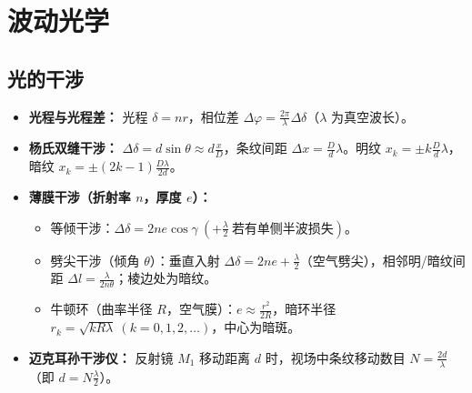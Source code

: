 \documentclass[zihao=5,a4paper,UTF8]{ctexart}
\begin{document}
\section{波动光学}

\subsection{光的干涉}

\begin{formulabox}[光的干涉核心公式]
\begin{itemize}
    \item \textbf{光程与光程差：} 光程 $\delta = nr$，相位差 $\Delta\varphi = \frac{2\pi}{\lambda}\Delta\delta$（$\lambda$ 为真空波长）。
    \item \textbf{杨氏双缝干涉：} $\Delta\delta = d\sin\theta \approx d\frac{x}{D}$，条纹间距 $\Delta x = \frac{D}{d}\lambda$。明纹 $x_k = \pm k\frac{D}{d}\lambda$，暗纹 $x_k = \pm(2k-1)\frac{D\lambda}{2d}$。
    \item \textbf{薄膜干涉（折射率 $n$，厚度 $e$）：}
    \begin{itemize}
        \item 等倾干涉：$\Delta\delta = 2ne\cos\gamma\ (+ \frac{\lambda}{2}\ \text{若有单侧半波损失})$。
        \item 劈尖干涉（倾角 $\theta$）：垂直入射 $\Delta\delta = 2ne + \frac{\lambda}{2}$（空气劈尖），相邻明/暗纹间距 $\Delta l = \frac{\lambda}{2n\theta}$；棱边处为暗纹。
        \item 牛顿环（曲率半径 $R$，空气膜）：$e \approx \frac{r^2}{2R}$，暗环半径 $r_k = \sqrt{kR\lambda}\ (k=0,1,2,\dots)$，中心为暗斑。
    \end{itemize}
    \item \textbf{迈克耳孙干涉仪：} 反射镜 $M_1$ 移动距离 $d$ 时，视场中条纹移动数目 $N = \frac{2d}{\lambda}$（即 $d = N\frac{\lambda}{2}$）。
\end{itemize}
\end{formulabox}
\end{document}
